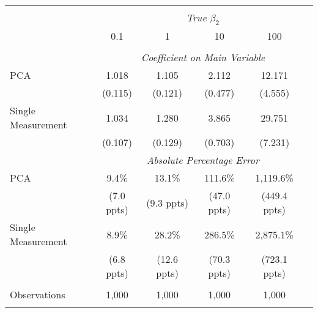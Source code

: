 \begin{table}[!htbp] \centering
\begin{tabular}{@{\extracolsep{5pt}}lccccc}
\\[-1.8ex]\hline
\hline \\[-1.8ex]
& \multicolumn{5}{c}{\textit{True $\beta_2$}} \
\cr 
\\[-1.8ex] & 0.1 & 1 & 10 & 100 \\
\hline \\[-1.8ex]
& \multicolumn{5}{c}{\textit{Coefficient on Main Variable}} \\
 PCA & 1.018 & 1.105 & 2.112 & 12.171  \\
  & (0.115) & (0.121) & (0.477) & (4.555)\\
  Single Measurement & 1.034 & 1.280 & 3.865 & 29.751  \\
  & (0.107) & (0.129) & (0.703) & (7.231)\\
& \multicolumn{5}{c}{\textit{Absolute Percentage Error}} \\
  PCA & 9.4\% & 13.1\% & 111.6\% & 1,119.6\%  \\
   & (7.0 ppts) & (9.3 ppts) & (47.0 ppts) & (449.4 ppts)\\
  Single Measurement & 8.9\% & 28.2\% & 286.5\% & 2,875.1\%  \\
  & (6.8 ppts) & (12.6 ppts) & (70.3 ppts) & (723.1 ppts)\\
\hline \\[-1.8ex]
 Observations & 1,000 & 1,000 & 1,000 & 1,000 &\\
\hline
\hline \\[-1.8ex]
\end{tabular}
\end{table}